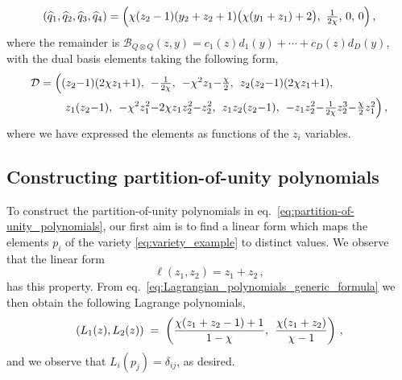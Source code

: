 \documentclass[dvipsnames,preprint,12pt,sort&compress]{elsarticle}
\begin{document}
\begin{equation}
(\widehat{q}_1, \widehat{q}_2, \widehat{q}_3, \widehat{q}_4)
= \Big( \chi (z_2-1) (y_2+z_2+1) \big(\chi  (y_1+z_1)+2 \big),
\hspace{1.2mm} \textstyle{\frac{1}{2\chi}}, \hspace{0.6mm} 0, \hspace{0.6mm} 0 \Big) \,,
\end{equation}
where the remainder is $\mathcal{B}_{Q \otimes Q} (z,y) = c_1 (z) d_1 (y) + \cdots + c_D (z) d_D (y)$,
with the dual basis elements taking the following form,
\begin{align}
\mathcal{D} &= \Big( (z_2{-}1) (2 \chi z_1{+}1), \hspace{1.5mm}
-\textstyle{\frac{1}{2 \chi}}, \hspace{1.5mm}
- \chi^2 z_1{-}\textstyle{\frac{\chi}{2}}, \hspace{1.5mm}
z_2 (z_2{-}1) (2 \chi z_1 {+} 1), \nonumber \\
& \hspace{8mm} z_1 (z_2{-}1), \hspace{1.5mm}
-\chi^2 z_1^2{-}2\chi z_1 z_2^2{-}z_2^2, \hspace{1.5mm}
z_1 z_2 (z_2{-}1), \hspace{1.5mm}
- z_1 z_2^2 {-} \textstyle{\frac{1}{2 \chi}} z_2^3 {-}\textstyle{\frac{\chi}{2}} z_1^2 \Big) \,,
\label{eq:dual_basis_example}
\end{align}
where we have expressed the elements as functions of the $z_i$ variables.


\subsection{Constructing partition-of-unity polynomials}

To construct the partition-of-unity polynomials
in eq.~\eqref{eq:partition-of-unity_polynomials}, our first aim
is to find a linear form which maps the elements $p_i$ of the
variety \eqref{eq:variety_example} to distinct values.
We observe that the linear form
\begin{equation}
\ell (z_1, z_2) = z_1 + z_2 \,,
\label{eq:linear_form_example}
\end{equation}
has this property. From eq.~\eqref{eq:Lagrangian_polynomials_generic_formula}
we then obtain the following Lagrange polynomials,
\begin{equation}
(L_1 (z), L_2 (z)) \hspace{1mm}=\hspace{1mm} \left( \frac{\chi (z_1+z_2-1)+1}{1-\chi}, \hspace{1.5mm} \frac{\chi (z_1+z_2)}{\chi-1} \right) \,,
\label{eq:Lagrange_polynomials_example}
\end{equation}
and we observe that $L_i (p_j) = \delta_{ij}$, as desired.
\end{document}
